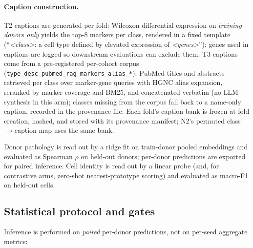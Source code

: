 \documentclass[11pt]{article}
\begin{document}
\paragraph{Caption construction.}
T2 captions are generated per fold: Wilcoxon differential expression on
\emph{training donors only} yields the top-8 markers per class, rendered
in a fixed template (``\emph{<class>}: a cell type defined by elevated
expression of \emph{<genes>}''); genes used in captions are logged so
downstream evaluations can exclude them. T3 captions come from a
pre-registered per-cohort corpus
(\texttt{type\_desc\_pubmed\_rag\_markers\_alias\_*}): PubMed titles and
abstracts retrieved per class over marker-gene queries with HGNC alias
expansion, reranked by marker coverage and BM25, and concatenated
verbatim (no LLM synthesis in this arm); classes missing from the
corpus fall back to a name-only caption, recorded in the provenance
file. Each fold's caption bank is frozen at fold creation,
hashed, and stored with its provenance manifest; N2's permuted
class$\to$caption map uses the same bank.

Donor pathology is read out by a ridge fit on train-donor pooled
embeddings and evaluated as Spearman $\rho$ on held-out donors;
per-donor predictions are exported for paired inference. Cell identity
is read out by a linear probe (and, for contrastive arms, zero-shot
nearest-prototype scoring) and evaluated as macro-F1 on held-out cells.

\subsection{Statistical protocol and gates}
\label{sec:stats}

Inference is performed on \emph{paired} per-donor predictions, not on
per-seed aggregate metrics:
\end{document}
